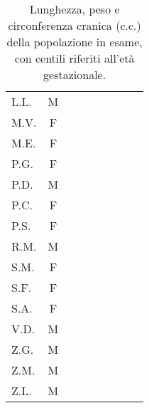 \begin{table}[!h]
\begin{center}
\begin{tabular}{lcccrcrrr}
L.L.	& M	& & & & & & &  \\
M.V.	& F	& & & & & & &  \\
M.E.	& F	& & & & & & &  \\
P.G.	& F	& & & & & & &  \\
P.D.	& M	& & & & & & &  \\
P.C.	& F	& & & & & & &  \\
P.S.	& F	& & & & & & &  \\
R.M.	& M	& & & & & & &  \\
S.M.	& F	& & & & & & &  \\
S.F.	& F	& & & & & & &  \\
S.A.	& F	& & & & & & &  \\
V.D.	& M	& & & & & & &  \\
Z.G.	& M	& & & & & & &  \\
Z.M.	& M	& & & & & & &  \\
Z.L.	& M	& & & & & & &  \\
\bottomrule
\end{tabular}
\end{center}
\caption{Lunghezza, peso e circonferenza cranica (c.c.) della popolazione in esame, con centili riferiti all'età gestazionale.}
\label{tab:VariabiliNeonatali}
\end{table}

